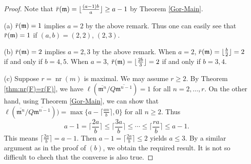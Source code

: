 \documentclass[12pt]{amsart}
\theoremstyle{definition}
\theoremstyle{remark}
\numberwithin{equation}{section}
\newcommand{\m}{{\mathfrak m}}
\DeclareMathOperator{\nr}{{nr}}
\newcommand{\ol}[1]{\mkern 1.5mu\overline{\mkern-1.5mu#1\mkern-1.5mu}\mkern 1.5mu} %
\begin{document}
\begin{proof}
Note that $\ol{r}(\m)=\lfloor \frac{(a-1)b}{a} \rfloor \ge a-1$ by Theorem \ref{Gor-Main}. 
\par \vspace{1mm} \par \noindent 
(a) $\ol{r}(\m) =1$ implies $a=2$ by the above remark. 
Thus one can easily see that  $\ol{r}(\m)=1$  if $(a,b)=(2,2)$, $(2,3)$. 
\par \vspace{1mm} \par \noindent 
(b) $\ol{r}(\m) =2$ implies $a=2,3$ by the above remark. 
When $a=2$, $\ol{r}(\m) =\lfloor \frac{b}{2} \rfloor =2$ if and only if $b=4,5$. 
When $a=3$, $\ol{r}(\m) =\lfloor \frac{2b}{3} \rfloor =2$ if and only if $b=3,4$. 
\par \vspace{1mm} \par \noindent 
(c) Suppose $r=\nr(m)$ is maximal. We may assume $r \ge 2$.  
By Theorem \ref{thm:nr(F)=r(F)}, 
we have $\ell(\overline{\m^n}/Q \overline{\m^{n-1}})=1$ 
for all $n=2,\ldots,r$.  
On the other hand, using Theorem \ref{Gor-Main},  we can 
show that  $\ell(\overline{\m^n}/Q \overline{\m^{n-1}}))=
\max\{a-\lceil \frac{an}{b}\rceil, 0\}$ 
for all $n \ge 2$. 
Thus 
\[
a-1=\lceil \frac{2a}{b}\rceil \le \lceil \frac{3a}{b}\rceil \le \cdots \le 
\lceil \frac{ra}{b}\rceil \le  a-1. 
\]
This means $\lceil \frac{2a}{b}\rceil =a-1$. 
Then $a-1 =\lceil \frac{2a}{b}\rceil \le 2$ yields $a \le 3$. 
By a similar argument as in the proof of $(b)$, we obtain the required result. 
It is not so difficult to chech that the converse is also true. 
\end{proof}
\end{document}
